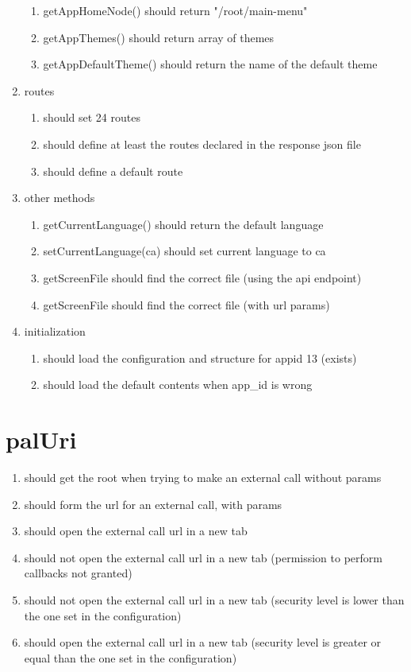 \begin{singlespace}
\begin{enumerate}
\begin{enumerate}
\item         getAppHomeNode() should return "/root/main-menu"
\item         getAppThemes() should return array of themes
\item         getAppDefaultTheme() should return the name of the default theme
\end{enumerate}
\item     routes
\begin{enumerate}
\item         should set 24 routes
\item         should define at least the routes declared in the response json file
\item         should define a default route
\end{enumerate}
\item     other methods
\begin{enumerate}
\item         getCurrentLanguage() should return the default language
\item         setCurrentLanguage(ca) should set current language to ca
\item         getScreenFile should find the correct file (using the api endpoint)
\item         getScreenFile should find the correct file (with url params)
\end{enumerate}
\item     initialization
\begin{enumerate}
\item         should load the configuration and structure for appid 13 (exists)
\item         should load the default contents when app\_id is wrong
\end{enumerate}
\end{enumerate}

\section{palUri}
\begin{enumerate}
\item     should get the root when trying to make an external call without params
\item     should form the url for an external call, with params
\item     should open the external call url in a new tab
\item     should not open the external call url in a new tab (permission to perform callbacks not granted)
\item     should not open the external call url in a new tab (security level is lower than the one set in the configuration)
\item     should open the external call url in a new tab (security level is greater or equal than the one set in the configuration)
\end{enumerate}

\end{singlespace}